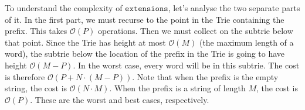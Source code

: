 \documentclass[a4paper,12pt]{article}
\newcommand{\kwa}[1]{\mathtt{#1}}
\begin{document}
\noindent
To understand the complexity of $\kwa{extensions}$, let's analyse the two separate parts of it. In the first part, we must recurse to the point in the Trie containing the prefix. This takes $\mathcal{O}(P)$ operations. Then we must collect on the subtrie below that point. Since the Trie has height at most $\mathcal{O}(M)$ (the maximum length of a word), the subtrie below the location of the prefix in the Trie is going to have height $\mathcal{O}(M-P)$. In the worst case, every word will be in this subtrie. The cost is therefore $\mathcal{O}(P + N \cdot (M - P))$. Note that when the prefix is the empty string, the cost is $\mathcal{O}(N \cdot M)$. When the prefix is a string of length $M$, the cost is $\mathcal{O}(P)$. These are the worst and best cases, respectively.
\end{document}
